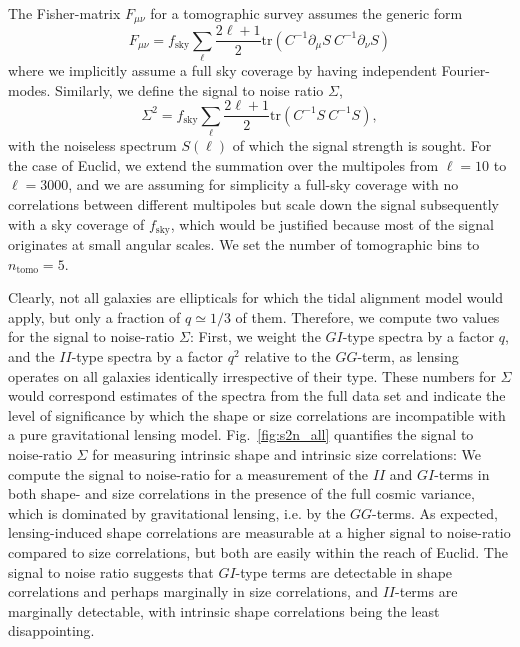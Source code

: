 \documentclass[a4paper,fleqn,usenatbib]{mnras}
\begin{document}
The Fisher-matrix $F_{\mu\nu}$ for a tomographic survey assumes the generic form
\begin{equation}
F_{\mu\nu} = f_\mathrm{sky}\sum_\ell\frac{2\ell+1}{2}\mathrm{tr}\left(C^{-1}\partial_\mu S\:C^{-1}\partial_\nu S\right)
\end{equation}
where we implicitly assume a full sky coverage by having independent Fourier-modes. Similarly, we define the signal to noise ratio $\Sigma$,
\begin{equation}
\Sigma^2 = f_\mathrm{sky}\sum_\ell\frac{2\ell+1}{2}\mathrm{tr}\left(C^{-1}S\:C^{-1}S\right),
\end{equation}
with the noiseless spectrum $S(\ell)$ of which the signal strength is sought. For the case of Euclid, we extend the summation over the multipoles from $\ell=10$ to $\ell=3000$, and we are assuming for simplicity a full-sky coverage with no correlations between different multipoles but scale down the signal subsequently with a sky coverage of $f_\mathrm{sky}$, which would be justified because most of the signal originates at small angular scales. We set the number of tomographic bins to $n_\mathrm{tomo} = 5$.

Clearly, not all galaxies are ellipticals for which the tidal alignment model would apply, but only a fraction of $q\simeq 1/3$ of them. Therefore, we compute two values for the signal to noise-ratio $\Sigma$: First, we weight the $GI$-type spectra by a factor $q$, and the $II$-type spectra by a factor $q^2$ relative to the $GG$-term, as lensing operates on all galaxies identically irrespective of their type. These numbers for $\Sigma$ would correspond estimates of the spectra from the full data set and indicate the level of significance by which the shape or size correlations are incompatible with a pure gravitational lensing model. Fig.~\ref{fig:s2n_all} quantifies the signal to noise-ratio $\Sigma$ for measuring intrinsic shape and intrinsic size correlations: We compute the signal to noise-ratio for a measurement of the $II$ and $GI$-terms in both shape- and size correlations in the presence of the full cosmic variance, which is dominated by gravitational lensing, i.e. by the $GG$-terms. As expected, lensing-induced shape correlations are measurable at a higher signal to noise-ratio compared to size correlations, but both are easily within the reach of Euclid. The signal to noise ratio suggests that $GI$-type terms are detectable in shape correlations and perhaps marginally in size correlations, and $II$-terms are marginally detectable, with intrinsic shape correlations being the least disappointing.
\end{document}
